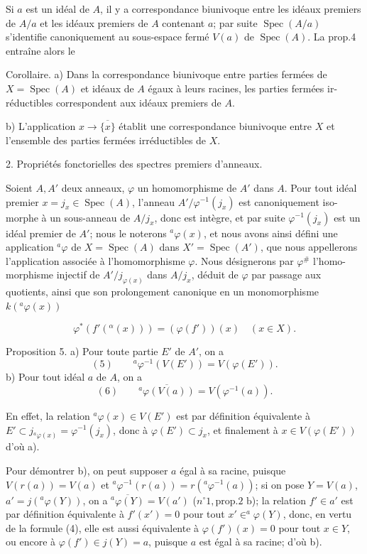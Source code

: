 Si $a$ est un idéal de $A$, il y a correspondance biunivoque entre les idéaux
premiers de $A/a$ et les idéaux premiers de $A$ contenant $a$; par suite $\operatorname{Spec}(A/a)$
s'identifie canoniquement au sous-espace fermé $V(a)$ de $\operatorname{Spec}(A)$. La prop.4
entraîne alors le

Corollaire. a) Dans la correspondance biunivoque entre parties fermées de
$X = \operatorname{Spec}(A)$ et idéaux de $A$ égaux à leurs racines, les parties fermées ir-
réductibles correspondent aux idéaux premiers de $A$.

b) L'application $x \to \overline{\{x\}}$ établit une correspondance biunivoque entre $X$
et l'ensemble des parties fermées irréductibles de $X$.

2. Propriétés fonctorielles des spectres premiers d'anneaux.

Soient $A, A'$ deux anneaux, $\varphi$ un homomorphisme de $A'$ dans $A$. Pour tout
idéal premier $x = j_x \in \operatorname{Spec}(A)$, l'anneau $A'/\varphi^{-1}(j_x)$ est canoniquement iso-
morphe à un sous-anneau de $A/j_x$, donc est intègre, et par suite $\varphi^{-1}(j_x)$ est
un idéal premier de $A'$; nous le noterons $^a\varphi(x)$, et nous avons ainsi défini
une application $^a\varphi$ de $X = \operatorname{Spec}(A)$ dans $X' = \operatorname{Spec}(A')$, que nous appellerons
l'application associée à l'homomorphisme $\varphi$. Nous désignerons par $\varphi^\#$ l'homo-
morphisme injectif de $A'/j_{\varphi(x)}$ dans $A/j_x$, déduit de $\varphi$ par passage aux
quotients, ainsi que son prolongement canonique en un monomorphisme $k(^a\varphi(x))$

\newpage


$$\varphi^\ast(f'(^\alpha(x))) = (\varphi(f'))(x) \quad (x \in X).$$

Proposition 5. a) Pour toute partie $E'$ de $A'$, on a
$$(5) \qquad ^a\varphi^{-1}(V(E')) = V(\varphi(E')).$$
b) Pour tout idéal $a$ de $A$, on a
$$(6) \qquad \overline{^a\varphi(V(a))} = V(\varphi^{-1}(a)).$$

En effet, la relation $^a\varphi(x) \in V(E')$ est par définition équivalente à $E' \subset j_{^a\varphi(x)} = \varphi^{-1}(j_x)$, donc à $\varphi(E') \subset j_x$, et finalement à $x \in V(\varphi(E'))$ d'où a).

Pour démontrer b), on peut supposer $a$ égal à sa racine, puisque $V(r(a)) = V(a)$ et $^a\varphi^{-1}(r(a)) = r(^a\varphi^{-1}(a))$; si on pose $Y = V(a)$, $a' = j(^a\varphi(Y))$, on a $\overline{^a\varphi(Y)} = V(a')$ ($n^\circ 1, \text{prop.} 2 \text{ b}$); la relation $f' \in a'$ est par définition équivalente à $f'(x') = 0$ pour tout $x' \in ^a\varphi(Y)$, donc, en vertu de la formule (4), elle est aussi équivalente à $\varphi(f')(x) = 0$ pour tout $x \in Y$, ou encore à $\varphi(f') \in j(Y) = a$, puisque $a$ est égal à sa racine; d'où b).

